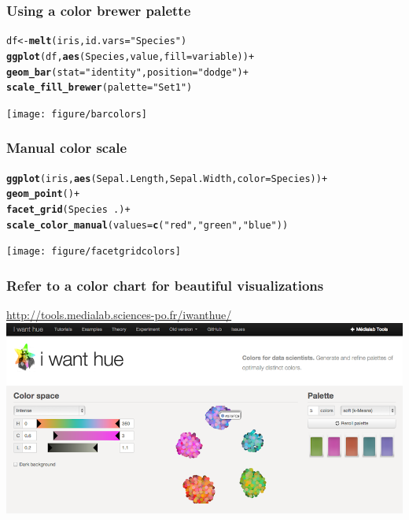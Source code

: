 \documentclass{beamer}\usepackage{graphicx, color}
\makeatletter
\newcommand{\hlfunctioncall}[1]{\textcolor[rgb]{0.501960784313725,0,0.329411764705882}{\textbf{#1}}}%
\newcommand{\hlstring}[1]{\textcolor[rgb]{0.6,0.6,1}{#1}}%
\newenvironment{kframe}{%
 \def\at@end@of@kframe{}%
 \ifinner\ifhmode%
  \def\at@end@of@kframe{\end{minipage}}%
  \begin{minipage}{\columnwidth}%
 \fi\fi%
 \def\FrameCommand##1{\hskip\@totalleftmargin \hskip-\fboxsep
 \colorbox{shadecolor}{##1}\hskip-\fboxsep
     \hskip-\linewidth \hskip-\@totalleftmargin \hskip\columnwidth}%
 \MakeFramed {\advance\hsize-\width
   \@totalleftmargin\z@ \linewidth\hsize
   \@setminipage}}%
 {\par\unskip\endMakeFramed%
 \at@end@of@kframe}
\newenvironment{knitrout}{}{} %
\makeatother
\begin{document}
\begin{frame}[fragile]
\frametitle{Using a color brewer palette}
\begin{knitrout}\footnotesize
{}\color{fgcolor}\begin{kframe}
\begin{alltt}
df  <- \hlfunctioncall{melt}(iris, id.vars = \hlstring{"Species"})
\hlfunctioncall{ggplot}(df, \hlfunctioncall{aes}(Species, value, fill = variable)) +
\hlfunctioncall{geom_bar}(stat = \hlstring{"identity"}, position = \hlstring{"dodge"}) +
\hlfunctioncall{scale_fill_brewer}(palette = \hlstring{"Set1"})
\end{alltt}
\end{kframe}
\texttt{[image: figure/barcolors]} 

\end{knitrout}

\end{frame}

\begin{frame}[fragile]
\frametitle{Manual color scale}
\begin{knitrout}\footnotesize
{}\color{fgcolor}\begin{kframe}
\begin{alltt}
\hlfunctioncall{ggplot}(iris, \hlfunctioncall{aes}(Sepal.Length, Sepal.Width, color = Species)) +
\hlfunctioncall{geom_point}() +
\hlfunctioncall{facet_grid}(Species ~ .) +
\hlfunctioncall{scale_color_manual}(values = \hlfunctioncall{c}(\hlstring{"red"}, \hlstring{"green"}, \hlstring{"blue"}))
\end{alltt}
\end{kframe}
\texttt{[image: figure/facetgridcolors]} 

\end{knitrout}

\end{frame}

\begin{frame}[fragile]
\frametitle{Refer to a color chart for beautiful visualizations}
\url{http://tools.medialab.sciences-po.fr/iwanthue/}
\includegraphics[scale=0.25]{images/color_schemes.png}
\end{frame}
\end{document}
